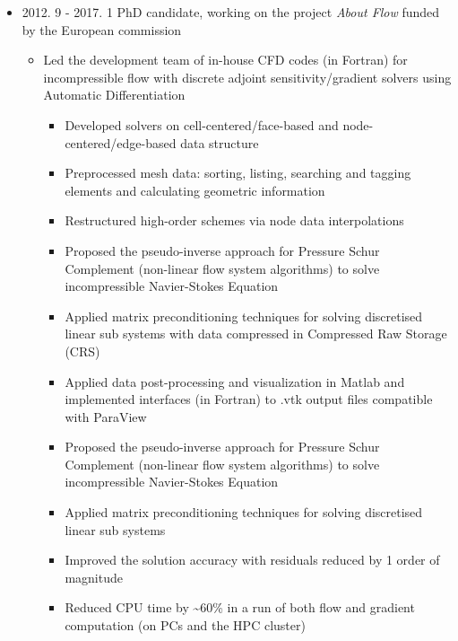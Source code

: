\documentclass[letterpaper]{article}
\begin{document}
\begin{itemize}
\item 2012. 9 - 2017. 1  \hspace{2pt} PhD candidate, working on the project \textsl{About Flow} funded by the European commission
		\begin{itemize}
		\item Led the development team of in-house CFD codes (in Fortran) for incompressible flow with discrete adjoint sensitivity/gradient solvers using Automatic Differentiation
		\begin{itemize}
		\item Developed solvers on cell-centered/face-based and node-centered/edge-based data structure
		\item Preprocessed mesh data: sorting, listing, searching and tagging elements and calculating geometric information
		\item Restructured high-order schemes via node data interpolations
		\item Proposed the pseudo-inverse approach for Pressure Schur Complement (non-linear flow system algorithms) to solve incompressible Navier-Stokes Equation
		\item Applied matrix preconditioning techniques for solving discretised linear sub systems with data compressed in Compressed Raw Storage (CRS)
%		
		\item Applied data post-processing and visualization in Matlab and implemented interfaces (in Fortran) to .vtk output files compatible with ParaView 
		\item Proposed the pseudo-inverse approach for Pressure Schur Complement (non-linear flow system algorithms) to solve incompressible Navier-Stokes Equation
		\item Applied matrix preconditioning techniques for solving discretised linear sub systems
		\item Improved the solution accuracy with residuals reduced by 1 order of magnitude
		\item Reduced CPU time by \textasciitilde 60\% in a run of both flow and gradient computation (on PCs and the HPC cluster)

\end{itemize}
\end{itemize}
\end{itemize}
\end{document}

